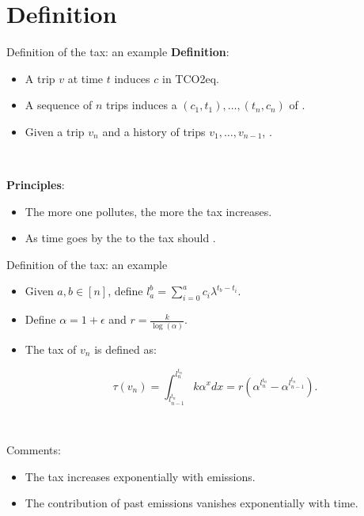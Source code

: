 \documentclass[french, english]{beamer}
\begin{document}
\section{Definition}
\begin{frame}{Definition of the tax: an example}
\textbf{Definition}:
\begin{itemize}
\item A trip $v$ at time $t$ induces  $c$ in TCO2eq.
\item A sequence of $n$ trips induces a  $(c_1,t_1),\ldots,(t_n,c_n)$ of .
\item Given a trip $v_n$ and a history of trips $v_1,\ldots, v_{n-1}$, .  
\end{itemize}

\

\textbf{Principles}:
\begin{itemize}
\item The more one pollutes, the more the tax increases. 
\item As time goes by the  to the tax should .
\end{itemize}
\end{frame}


\begin{frame}{Definition of the tax: an example}
    \begin{itemize}
    \item Given $a,b \in [n]$, define $l_a^{b} = \sum_{i = 0}^a c_i \lambda^{t_b - t_i}$.
    \item Define $\alpha = 1 + \epsilon$ and $r = \frac{k}{\log(\alpha)}$.
    \item The tax of $v_n$ is defined as: \begin{tcolorbox}$$ \tau(v_n) = \int_{l_{n-1}^{t_n}}^{l_n^{t_n}} k \alpha^x dx = r (\alpha^{l_n^{t_n}} - \alpha^{l_{n - 1}^{t_n}}).$$\end{tcolorbox}
    \end{itemize}	
    
    \

   Comments:
   \begin{itemize}
   \item The tax increases exponentially with emissions.
   \item The contribution of past emissions vanishes exponentially with time.
   \end{itemize}

\end{frame}
\end{document}
